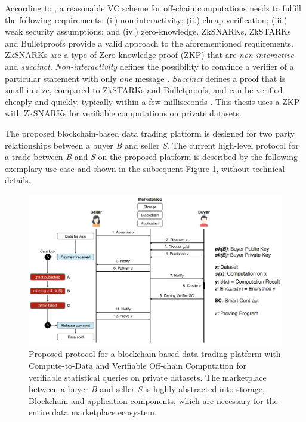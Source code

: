 According to \cite{eberhardtOffchainingModelsApproaches2018}, a reasonable VC scheme for off-chain computations needs to fulfill the following requirements: (i.) non-interactivity; (ii.) cheap verification; (iii.) weak security assumptions; and (iv.) zero-knowledge. ZkSNARKs, ZkSTARKs and Bulletproofs provide a valid approach to the aforementioned requirements. ZkSNARKs are a type of Zero-knowledge proof (ZKP) that are \emph{non-interactive} and \emph{succinct}. \emph{Non-interactivity} defines the possibility to convince a verifier of a particular statement with only \emph{one} message \cite{eberhardtOffchainingModelsApproaches2018,eberhardtZoKratesScalablePrivacyPreserving2018a,simunicVerifiableComputingApplications2021}. \emph{Succinct} defines a proof that is small in size, compared to ZkSTARKs and Bulletproofs, and can be verified cheaply and quickly, typically within a few milliseconds \cite{simunicVerifiableComputingApplications2021}. This thesis uses a ZKP with ZkSNARKs for verifiable computations on private datasets.

The proposed blockchain-based data trading platform is designed for two party relationships between a buyer \emph{B} and seller \emph{S}. The current high-level protocol for a trade between \emph{B} and \emph{S} on the proposed platform is described by the following exemplary use case and shown in the subsequent Figure \ref{fig:usecase}, without technical details.

\begin{figure}[!htb]
    \centering
    \includegraphics[width=14cm]{images/protocol.png}
    \caption{Proposed protocol for a blockchain-based data trading platform with Compute-to-Data and Verifiable Off-chain Computation for verifiable statistical queries on private datasets. The marketplace between a buyer \emph{B} and seller \emph{S} is highly abstracted into storage, Blockchain and application components, which are necessary for the entire data marketplace ecosystem.}
    \label{fig:usecase}
\end{figure}

